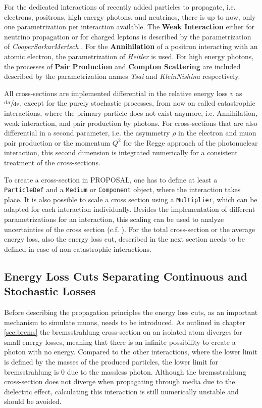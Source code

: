 For the dedicated interactions of recently added particles to propagate, i.e. electrons, positrons, high energy photons, and neutrinos, there is up to now, only one parametrization per interaction available.
The \textbf{Weak Interaction} either for neutrino propagation or for charged leptons is described by the parametrization of \textit{CooperSarkarMertsch} \cite{CSMS11NuXsection}.
For the \textbf{Annihilation} of a positron interacting with an atomic electron, the parametrization of \textit{Heitler} \cite{Heitler54} is used.
For high energy photons, the processes of \textbf{Pair Production} and \textbf{Compton Scattering} are included described by the parametrization names \textit{Tsai} and \textit{KleinNishina} respectively.

All cross-sections are implemented differential in the relative energy loss $v$ as $\sfrac{\mathrm{d} \sigma}{\mathrm{d} v}$, except for the purely stochastic processes, from now on called catastrophic interactions, where the primary particle does not exist anymore, i.e. Annihilation, weak interaction, and pair production by photons.
For cross-sections that are also differential in a second parameter, i.e. the asymmetry $\rho$ in the electron and muon pair production or the momentum $Q^2$ for the Regge approach of the photonuclear interaction, this second dimension is integrated numerically for a consistent treatment of the cross-sections.

To create a cross-section in PROPOSAL, one has to define at least a \texttt{ParticleDef} and a \texttt{Medium} or \texttt{Component} object, where the interaction takes place.
It is also possible to scale a cross section using a \texttt{Multiplier}, which can be adapted for each interaction individually.
Besides the implementation of different parametrizations for an interaction, this scaling can be used to analyze uncertainties of the cross section (c.f. ).
For the total cross-section or the average energy loss, also the energy loss cut, described in the next section %
needs to be defined in case of non-catastrophic interactions.

%

\subsection{Energy Loss Cuts Separating Continuous and Stochastic Losses} \label{sec:ecuts}

Before describing the propagation principles the energy loss cuts, as an important mechanism to simulate muons, needs to be introduced.
As outlined in chapter \ref{sec:brems} the bremsstrahlung cross-section on an isolated atom diverges for small energy losses, meaning that there is an infinite possibility to create a photon with no energy.
Compared to the other interactions, where the lower limit is defined by the masses of the produced particles, the lower limit for bremsstrahlung is \num{0} due to the massless photon.
Although the bremsstrahlung cross-section does not diverge when propagating through media due to the dielectric effect, calculating this interaction is still numerically unstable and should be avoided.

